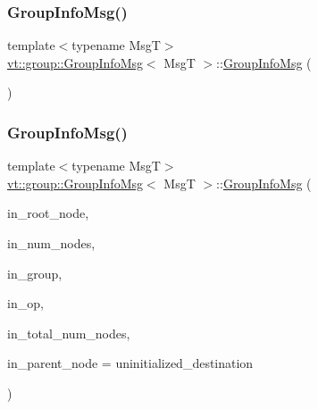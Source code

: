 \subsubsection{\texorpdfstring{Group\+Info\+Msg()}{GroupInfoMsg()}\hspace{0.1cm}{\footnotesize\ttfamily [1/2]}}
{\footnotesize\ttfamily template$<$typename MsgT$>$ \\
\hyperlink{structvt_1_1group_1_1_group_info_msg}{vt\+::group\+::\+Group\+Info\+Msg}$<$ MsgT $>$\+::\hyperlink{structvt_1_1group_1_1_group_info_msg}{Group\+Info\+Msg} (\begin{DoxyParamCaption}{ }\end{DoxyParamCaption})\hspace{0.3cm}{\ttfamily [default]}}

\mbox{\label{structvt_1_1group_1_1_group_info_msg_a8d7363206ca034b3f3f45b790c6ecf35}} 
\subsubsection{\texorpdfstring{Group\+Info\+Msg()}{GroupInfoMsg()}\hspace{0.1cm}{\footnotesize\ttfamily [2/2]}}
{\footnotesize\ttfamily template$<$typename MsgT$>$ \\
\hyperlink{structvt_1_1group_1_1_group_info_msg}{vt\+::group\+::\+Group\+Info\+Msg}$<$ MsgT $>$\+::\hyperlink{structvt_1_1group_1_1_group_info_msg}{Group\+Info\+Msg} (\begin{DoxyParamCaption}\item[{\hyperlink{namespacevt_a866da9d0efc19c0a1ce79e9e492f47e2}{Node\+Type} const \&}]{in\+\_\+root\+\_\+node,  }\item[{\hyperlink{namespacevt_a866da9d0efc19c0a1ce79e9e492f47e2}{Node\+Type} const \&}]{in\+\_\+num\+\_\+nodes,  }\item[{\hyperlink{namespacevt_a27b5e4411c9b6140c49100e050e2f743}{Group\+Type} const \&}]{in\+\_\+group,  }\item[{\hyperlink{namespacevt_1_1group_a73f2624ddeb535b39a08b6524f26b244}{Remote\+Operation\+I\+D\+Type}}]{in\+\_\+op,  }\item[{\hyperlink{namespacevt_a866da9d0efc19c0a1ce79e9e492f47e2}{Node\+Type} const \&}]{in\+\_\+total\+\_\+num\+\_\+nodes,  }\item[{\hyperlink{namespacevt_a866da9d0efc19c0a1ce79e9e492f47e2}{Node\+Type} const \&}]{in\+\_\+parent\+\_\+node = {\ttfamily uninitialized\+\_\+destination} }\end{DoxyParamCaption})\hspace{0.3cm}{\ttfamily [inline]}}



